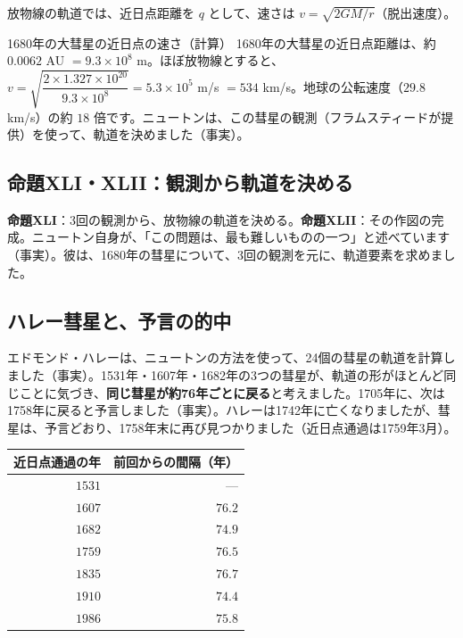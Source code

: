 \documentclass[a4paper,11pt,openany]{ltjsbook}
\begin{document}
放物線の軌道では、近日点距離を $q$ として、速さは $v=\sqrt{2GM/r}$（脱出速度）。

\begin{examplebox}{1680年の大彗星の近日点の速さ（計算）}
1680年の大彗星の近日点距離は、約 $0.0062$ AU $=9.3\times10^8$ m。ほぼ放物線とすると、$v=\sqrt{\dfrac{2\times1.327\times10^{20}}{9.3\times10^8}}=5.3\times10^5$ m/s $=534$ km/s。地球の公転速度（$29.8$ km/s）の約 $18$ 倍です。ニュートンは、この彗星の観測（フラムスティードが提供）を使って、軌道を決めました（事実）。
\end{examplebox}

\subsection{命題XLI・XLII：観測から軌道を決める}

\textbf{命題XLI}：3回の観測から、放物線の軌道を決める。\textbf{命題XLII}：その作図の完成。ニュートン自身が、「この問題は、最も難しいものの一つ」と述べています（事実）。彼は、1680年の彗星について、3回の観測を元に、軌道要素を求めました。

\subsection{ハレー彗星と、予言の的中}

エドモンド・ハレーは、ニュートンの方法を使って、24個の彗星の軌道を計算しました（事実）。1531年・1607年・1682年の3つの彗星が、軌道の形がほとんど同じことに気づき、\textbf{同じ彗星が約76年ごとに戻る}と考えました。1705年に、次は1758年に戻ると予言しました（事実）。ハレーは1742年に亡くなりましたが、彗星は、予言どおり、1758年末に再び見つかりました（近日点通過は1759年3月）。

\begin{center}
\begin{tabular}{rr}
\toprule
近日点通過の年 & 前回からの間隔（年）\\
\midrule
$1531$ & ---\\
$1607$ & $76.2$\\
$1682$ & $74.9$\\
$1759$ & $76.5$\\
$1835$ & $76.7$\\
$1910$ & $74.4$\\
$1986$ & $75.8$\\
\bottomrule
\end{tabular}
\end{center}
\end{document}
